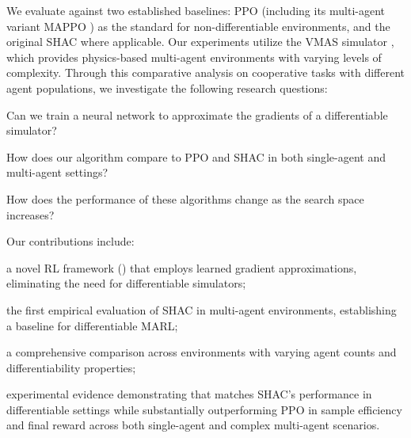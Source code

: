 We evaluate \fname{} against two established baselines: PPO \cite{Schulman17} (including its multi-agent variant MAPPO \cite{DBLP:conf/nips/YuVVGWBW22}) as the standard for non-differentiable environments, and the original SHAC \cite{Xu22} where applicable. Our experiments utilize the VMAS simulator \cite{DBLP:conf/dars/BettiniKBP22}, which provides physics-based multi-agent environments with varying levels of complexity. Through this comparative analysis on cooperative tasks with different agent populations, we investigate the following research questions:

\begin{compactitem}
    \item {} Can we train a neural network to approximate the gradients of a differentiable simulator?
    \item {} How does our algorithm compare to PPO and SHAC in both single-agent and multi-agent settings?
    \item {} How does the performance of these algorithms change as the search space increases?
\end{compactitem}

\noindent Our contributions include:
\begin{compactitem}
    \item a novel RL framework (\fname{}) that employs learned gradient approximations, eliminating the need for differentiable simulators;
    \item the first empirical evaluation of SHAC in multi-agent environments, establishing a baseline for differentiable MARL;
    \item a comprehensive comparison across environments with varying agent counts and differentiability properties;
    \item experimental evidence demonstrating that \fname{} matches SHAC's performance in differentiable settings while substantially outperforming PPO in sample efficiency and final reward across both single-agent and complex multi-agent scenarios.
\end{compactitem}
